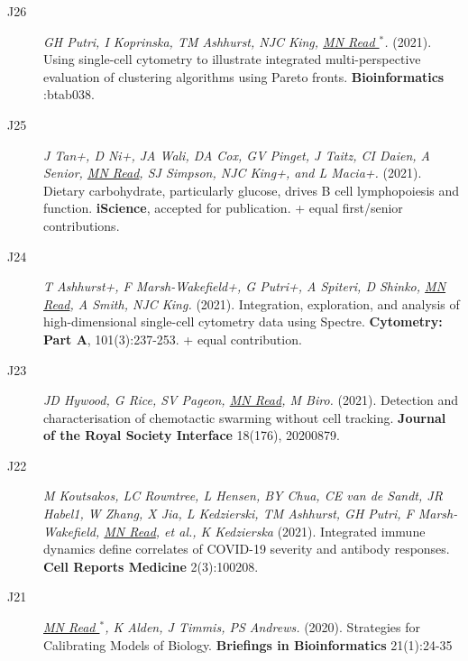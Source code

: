 \documentclass[a4paper]{article}
\begin{document}
\begin{description}
\item[J26]
\textit{GH Putri, I Koprinska, TM Ashhurst, NJC King, \underline{MN Read $^{*}$}.}
(2021).
Using single-cell cytometry to illustrate integrated multi-perspective evaluation of clustering algorithms using Pareto fronts.
\textbf{Bioinformatics} :btab038.

\item[J25]
\textit{J Tan+, D Ni+, JA Wali, DA Cox, GV Pinget, J Taitz, CI Daien, A Senior, \underline{MN Read}, SJ Simpson, NJC King+, and L Macia+.}
(2021).
Dietary carbohydrate, particularly glucose, drives B cell lymphopoiesis and function.
\textbf{iScience}, accepted for publication. + equal first/senior contributions.

\item[J24]
\textit{T Ashhurst+, F Marsh-Wakefield+, G Putri+, A Spiteri, D Shinko, \underline{MN Read}, A Smith, NJC King.}
(2021).
Integration, exploration, and analysis of high-dimensional single-cell cytometry data using Spectre.
\textbf{Cytometry: Part A}, 101(3):237-253. + equal contribution.

\item[J23]
\textit{JD Hywood, G Rice, SV Pageon, \underline{MN Read}, M Biro.}
(2021).
Detection and characterisation of chemotactic swarming without cell tracking.
\textbf{Journal of the Royal Society Interface} 18(176), 20200879.

\item[J22]
\textit{M Koutsakos, LC Rowntree, L Hensen, BY Chua, CE van de Sandt, JR Habel1, W Zhang, X Jia, L Kedzierski, TM Ashhurst, GH Putri, F Marsh-Wakefield, \underline{MN Read}, et al., K Kedzierska}
(2021).
Integrated immune dynamics define correlates of COVID-19 severity and antibody responses.
\textbf{Cell Reports Medicine} 2(3):100208.

\item[J21]
\textit{\underline{MN Read $^{*}$}, K Alden, J Timmis, PS Andrews.}
(2020).
Strategies for Calibrating Models of Biology.
\textbf{Briefings in Bioinformatics} 21(1):24-35


\end{description}
\end{document}
